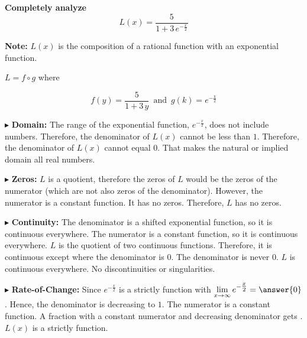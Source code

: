 \documentclass{ximera}
\begin{document}
\begin{example}

\textbf{Completely analyze} \\


\[   L(x) = \frac{5}{1 + 3 \, e^{-\tfrac{x}{2}}} \]




\textbf{Note:} $L(x)$ is the composition of a rational function with an exponential function.

$L = f \circ g$ where

\[  f(y) =  \frac{5}{1 + 3 \, y}  \, \text{ and } \, g(k) = e^{-\tfrac{k}{2}}    \]




$\blacktriangleright$  \textbf{Domain:} The range of the exponential function, $e^{-\tfrac{x}{2}}$, does not include   numbers. Therefore, the denominator of $L(x)$ cannot be less than $1$. Therefore, the denominator of $L(x)$ cannot equal $0$.  That makes the natural or implied domain all real numbers.


$\blacktriangleright$ \textbf{Zeros:} $L$ is a quotient, therefore the zeros of $L$ would be the zeros of the numerator (which are not also zeros of the denominator).  However, the numerator is a constant function.  It has no zeros. Therefore, $L$ has no zeros.



$\blacktriangleright$ \textbf{Continuity:} The denominator is a shifted exponential function, so it is continuous everywhere. The numerator is a constant function, so it is continuous everywhere.  $L$ is the quotient of two continuous functions.  Therefore, it is continuous except where the denominator is $0$.  The denominator is never $0$. $L$ is continuous everywhere.  No discontinuities or singularities.








$\blacktriangleright$ \textbf{Rate-of-Change:}    Since $e^{-\tfrac{x}{2}}$ is a strictly   function with $\lim\limits_{x \to \infty}e^{-\tfrac{x}{2}}=\answer{0}$. Hence, the denominator is decreasing to $1$. The numerator is a constant function. A fraction with a constant numerator and decreasing denominator gets  . $L(x)$ is a strictly   function.







\end{example}
\end{document}
